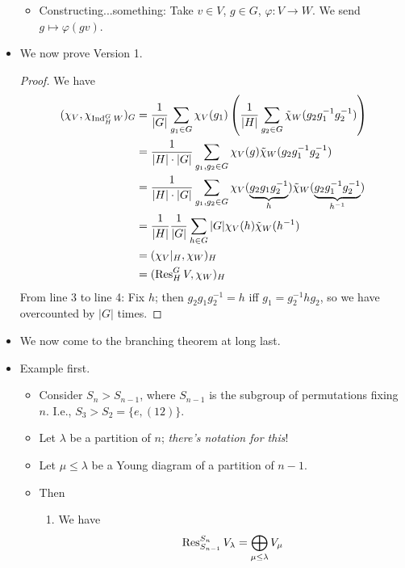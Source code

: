 \documentclass[../notes.tex]{subfiles}
\begin{document}
\begin{itemize}
\begin{itemize}
\begin{itemize}
        \end{itemize}
        \item Constructing...something: Take $v\in V$, $g\in G$, $\varphi:V\to W$. We send $g\mapsto\varphi(gv)$.
    \end{itemize}
    \item We now prove Version 1.
    \begin{proof}
        We have
        \begin{align*}
            (\chi_V,\chi_{\operatorname{Ind}_H^GW})_G &= \frac{1}{|G|}\sum_{g_1\in G}\chi_V(g_1)\left( \frac{1}{|H|}\sum_{g_2\in G}\tilde{\chi}_W(g_2g_1^{-1}g_2^{-1}) \right)\\
            &= \frac{1}{|H|\cdot|G|}\sum_{g_1,g_2\in G}\chi_V(g)\tilde{\chi}_W(g_2g_1^{-1}g_2^{-1})\\
            &= \frac{1}{|H|\cdot|G|}\sum_{g_1,g_2\in G}\chi_V(\underbrace{g_2g_1g_2^{-1}}_h)\tilde{\chi}_W(\underbrace{g_2g_1^{-1}g_2^{-1}}_{h^{-1}})\\
            &= \frac{1}{|H|}\frac{1}{|G|}\sum_{h\in G}|G|\chi_V(h)\tilde{\chi}_W(h^{-1})\\
            &= (\chi_V|_H,\chi_W)_H\\
            &= (\operatorname{Res}_H^GV,\chi_W)_H
        \end{align*}
        From line 3 to line 4: Fix $h$; then $g_2g_1g_2^{-1}=h$ iff $g_1=g_2^{-1}hg_2$, so we have overcounted by $|G|$ times.
    \end{proof}
    \item We now come to the branching theorem at long last.
    \item Example first.
    \begin{itemize}
        \item Consider $S_n>S_{n-1}$, where $S_{n-1}$ is the subgroup of permutations fixing $n$. I.e., $S_3>S_2=\{e,(12)\}$.
        \item Let $\lambda$ be a partition of $n$; \emph{there's notation for this}!
        \item Let $\mu\leq\lambda$ be a Young diagram of a partition of $n-1$.
        \item Then
        \begin{enumerate}
            \item We have
            \begin{equation*}
                \operatorname{Res}_{S_{n-1}}^{S_n}V_\lambda = \bigoplus_{\mu\leq\lambda}V_\mu
            \end{equation*}
            \begin{itemize}

\end{itemize}
\end{enumerate}
\end{itemize}
\end{itemize}
\end{document}

